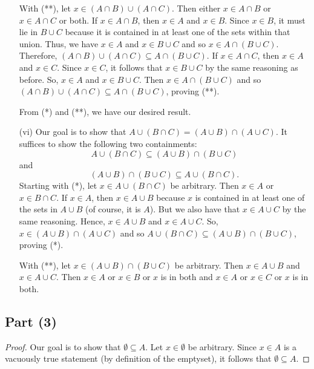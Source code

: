 \documentclass[a4paper]{article}
\begin{document}
\begin{enumerate}
        With (**), let \( x \in (A \cap B) \cup (A \cap C) \). Then either \( x \in A \cap B \) or \( x \in A \cap C  \) or both. If \( x \in A \cap B \), then \( x \in A  \) and \( x \in B  \). Since \( x \in B \), it must lie in \( B \cup C  \) because it is contained in at least one of the sets within that union. Thus, we have \( x \in A  \) and \( x \in B \cup C  \) and so \( x \in A \cap (B \cup C) \). Therefore, \( (A \cap B) \cup (A \cap C) \subseteq A \cap (B \cup C) \). If \( x \in A \cap C \), then \( x \in A  \) and \( x \in C  \). Since \( x \in C  \), it follows that \( x \in B \cup C  \) by the same reasoning as before. So, \( x \in A  \) and \( x \in B \cup C  \). Then \( x \in A \cap (B \cup C) \) and so \( (A \cap B) \cup (A \cap C) \subseteq A \cap (B \cup C) \), proving (**).

        From (*) and (**), we have our desired result. 
    \item[(vi)] Our goal is to show that \( A \cup (B \cap C) = (A \cup B) \cap (A \cup C) \). It suffices to show the following two containments:
        \[  A \cup  (B \cap C) \subseteq (A \cup B) \cap (B \cup C) \tag{*} \]
        and
        \[  (A \cup B) \cap (B \cup C) \subseteq  A \cup (B \cap C). \tag{**} \]
        Starting with (*), let \( x \in A \cup (B \cap C) \) be arbitrary. Then \( x \in A  \) or \( x \in B \cap C \). If \(x \in A  \), then \( x \in A \cup B \) because \( x  \) is contained in at least one of the sets in \( A \cup B  \) (of course, it is \( A  \)). But we also have that \( x \in A \cup C  \) by the same reasoning. Hence, \( x \in A \cup B  \) and \( x \in A \cup C  \). So, \( x \in (A \cup B) \cap (A \cup C) \) and so \( A \cup (B \cap C) \subseteq (A \cup B) \cap (B \cup C)  \), proving (*).

       With (**), let \( x \in (A \cup B) \cap (B \cup C) \) be arbitrary. Then \( x \in A \cup B \) and \( x \in A \cup C  \). Then \( x \in A  \) or \( x \in B \) or \( x  \) is in both and \( x \in A  \) or \( x \in C \) or \( x  \) is in both.   
\end{enumerate}


\subsection*{Part (3)}

\begin{proof}
    Our goal is to show that \( \emptyset \subseteq  A  \). Let \( x \in \emptyset \) be arbitrary. Since \( x \in A  \) is a vacuously true statement (by definition of the emptyset), it follows that \( \emptyset \subseteq  A  \).
\end{proof}
\end{document}
